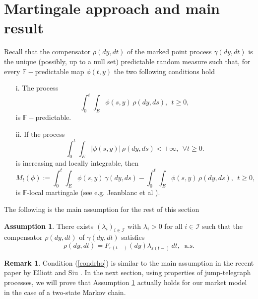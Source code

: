 \documentclass[11pt]{article}
\theoremstyle{plain}
\theoremstyle{definition}
\newtheorem{remark}[theorem]{Remark}
\numberwithin{equation}{section}
\newtheorem{Assumption}{Assumption}
\newcommand{\abs}[1]{\left\vert#1\right\vert}
\newcommand{\calI}{\mathcal{I}}
\newcommand{\eps}{\varepsilon}
\newcommand{\Fil}{\mathds{F}}
\begin{document}
\section{Martingale approach and main result}
Recall that the compensator $\rho(dy,dt)$ of the marked point process $\gamma(dy,dt)$ is the unique (possibly, up to a null set) predictable random measure such that, for every $\Fil-$predictable map $\phi(t,y)$ the two following conditions hold
\begin{itemize}
  \item[i.] The process
  \[
  \int_0^t\int_E\phi(s,y)\,\rho(dy,ds), \ \ t\geq 0,
  \]
  is $\Fil-$predictable.

  \item[ii.] If the process
  \[
  \int_0^t\int_E\abs{\phi(s,y)}\,\rho(dy,ds)<+\infty, \ \ \forall t\geq 0.
\]
is increasing and locally integrable, then
\[
M_t(\phi):=\int_0^t\int_E \phi(s,y)\,\gamma(dy,ds)-\int_0^t\int_E\phi(s,y)\,\rho(dy,ds), \ \ t\geq 0,
\]
is $\Fil$-local martingale (see e.g. Jeanblanc et al \cite[Definition 8.8.2.1]{jeanblanc}).
\end{itemize}
The following is the main assumption for the rest of this section
\begin{Assumption}\label{A1}
There exists $(\lambda_i)_{i\in\calI}$ with $\lambda_i>0$ for all $i\in\calI$ such that the compensator $\rho(dy,dt)$ of $\gamma(dy,dt)$ satisfies
  \begin{equation}\label{condrho}
  \rho(dy,dt)=F_{\eps(t-)}(dy)\lambda_{\eps(t-)}\,dt, \ \mbox{ a.s.}
  \end{equation}
\end{Assumption}

\begin{remark}
Condition (\ref{condrho}) is similar to the main assumption in the recent paper by Elliott and Siu \cite{elliottsiu}. In the next section, using properties of jump-telegraph processes, we will prove that Assumption \ref{A1} actually holds for our market model in the case of a two-state Markov chain.
\end{remark}
\end{document}
